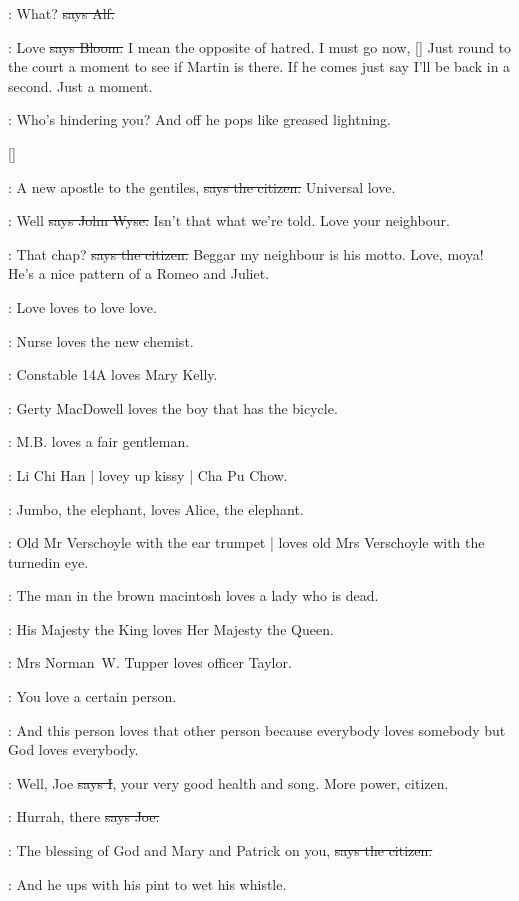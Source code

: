 \bergan:
What?
\sout{says Alf.}

\Bloom:
Love
\sout{says Bloom.}
I mean the opposite of hatred.
I must go now,
[]
Just round to the court a moment to see if Martin is there.
If he comes just say I'll be back in a second.
Just a moment.

\Nq:
Who's hindering you?
And off he pops like greased lightning.

[]

\citizen:
A new apostle to the gentiles,
\sout{says the citizen.}
Universal love.

\johnwyse:
Well
\sout{says John Wyse.}
Isn't that what we're told.
Love your neighbour.

\citizen:
That chap?
\sout{says the citizen.}
Beggar my neighbour is his motto.
Love,
moya!
He's a nice pattern of a Romeo and Juliet.

:
Love loves to love love.

:
Nurse loves the new chemist.

:
Constable 14A loves Mary Kelly.

:
Gerty MacDowell loves the boy that has the bicycle.

:
M.B. loves a fair gentleman.

:
Li Chi Han |
lovey up kissy |
Cha Pu Chow.

:
Jumbo, the elephant,
loves Alice, the elephant.

:
Old Mr Verschoyle with the ear trumpet |
loves old Mrs Verschoyle with the turnedin eye.

:
The man in the brown macintosh loves a lady who is dead.

:
His Majesty the King loves Her Majesty the Queen.

:
Mrs Norman~W. Tupper loves officer Taylor.

:
You love a certain person.

:
And this person loves that other person because everybody loves somebody
but God loves everybody.

:
Well,
Joe
\sout{says I},
your very good health and song.
More power,
citizen.

\joe:
Hurrah,
there
\sout{says Joe.}

\citizen:
The blessing of God and Mary and Patrick on you,
\sout{says the citizen.}

\Nq:
And he ups with his pint to wet his whistle.

